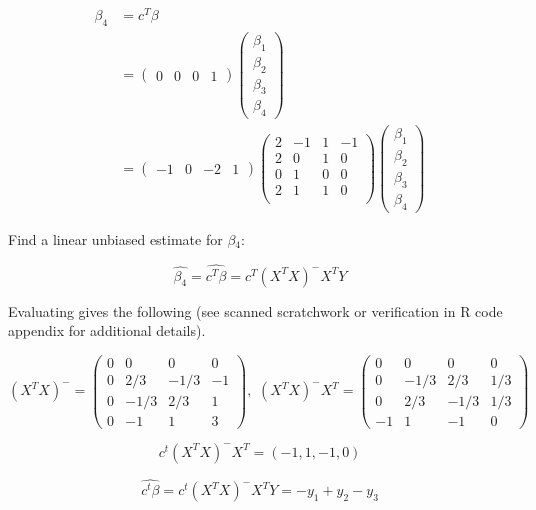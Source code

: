 \documentclass[11pt]{article}
\begin{document}
\begin{align*}
\beta_4 &= c^T\beta\\
        &= \begin{pmatrix} 0 & 0 & 0 & 1 \end{pmatrix}\begin{pmatrix} \beta_1 \\ \beta_2 \\ \beta_3 \\ \beta_4 \end{pmatrix} \\
        &= \begin{pmatrix} -1 & 0 & -2 & 1 \end{pmatrix}\begin{pmatrix}{}
  2 & -1 & 1 & -1 \\ 
  2 & 0 & 1 & 0 \\ 
  0 & 1 & 0 & 0 \\ 
  2 & 1 & 1 & 0 \\ 
  \end{pmatrix}\begin{pmatrix} \beta_1 \\ \beta_2 \\ \beta_3 \\ \beta_4 \end{pmatrix}
\end{align*}


Find a linear unbiased estimate for $\beta$$_4$:

$$\hat{\beta_4} = \widehat{c^T\beta} = c^T(X^TX)^-X^TY$$

Evaluating gives the following (see scanned scratchwork or
verification in R code appendix for
additional details).

$$(X^TX)^- = \begin{pmatrix} 0 & 0 & 0 & 0 \\ 0 & 2/3 & -1/3 & -1 \\ 0
& -1/3 & 2/3 & 1 \\ 0 & -1 & 1 & 3 \end{pmatrix},\,\,(X^TX)^-X^T=\begin{pmatrix} 0 & 0 & 0 & 0 \\ 0 & -1/3 & 2/3 & 1/3 \\ 0
& 2/3 & -1/3 & 1/3 \\ -1 & 1 & -1 & 0 \end{pmatrix}$$

$$c^t(X^TX)^-X^T = (-1, 1, -1, 0)$$

$$\widehat{c^t\beta}=c^t(X^TX)^-X^TY = -y_1 + y_2 - y_3$$
\end{document}
